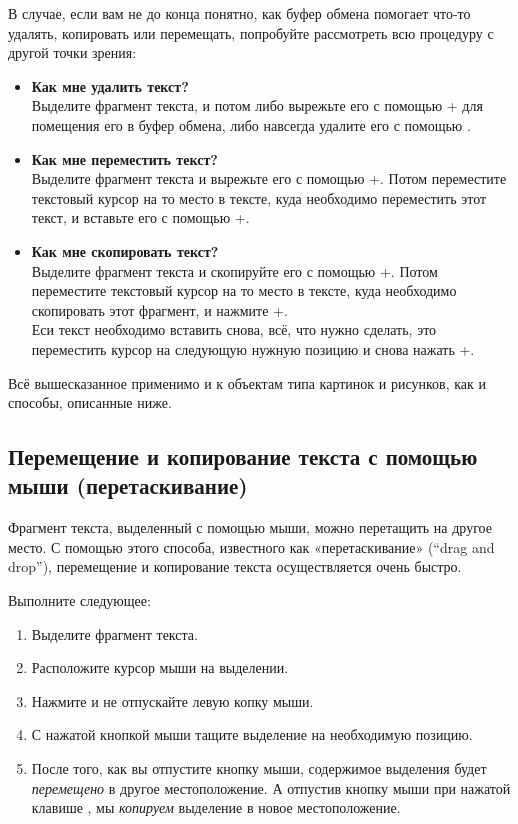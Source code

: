 ﻿\documentclass[a4paper,10pt]{article}
\begin{document}
В случае, если вам не до конца понятно, как буфер обмена помогает что-то удалять, копировать или перемещать, попробуйте рассмотреть всю процедуру с другой точки зрения:
\begin{itemize}
 \item \textbf{Как мне удалить текст?}\\
 Выделите фрагмент текста, и потом либо вырежьте его с помощью + для помещения его в буфер обмена, либо навсегда удалите его с помощью .
 \item \textbf{Как мне переместить текст?}\\
Выделите фрагмент текста и вырежьте его с помощью +. Потом переместите текстовый курсор на то место в тексте, куда необходимо переместить этот текст, и вставьте его с помощью +.
\item \textbf{Как мне скопировать текст?}\\
Выделите фрагмент текста и скопируйте его с помощью +. Потом переместите текстовый курсор на то место в тексте, куда необходимо скопировать этот фрагмент, и нажмите +.\\
Еси текст необходимо вставить снова, всё, что нужно сделать, это переместить курсор на следующую нужную позицию и снова нажать +.
\end{itemize}

Всё вышесказанное применимо и к объектам типа картинок и рисунков, как и способы, описанные ниже.

\subsection{Перемещение и копирование текста с помощью мыши (перетаскивание)}
Фрагмент текста, выделенный с помощью мыши, можно перетащить на другое место. С помощью этого способа, известного как «перетаскивание» (“drag and drop”), перемещение и копирование текста осуществляется очень быстро.

Выполните следующее:

\begin{enumerate}
 \item Выделите фрагмент текста.
 \item Расположите курсор мыши на выделении.
 \item Нажмите и не отпускайте левую копку мыши.
 \item С нажатой кнопкой мыши тащите выделение на необходимую позицию.
 \item После того, как вы отпустите кнопку мыши, содержимое выделения будет \textit{перемещено} в другое местоположение. А отпустив кнопку мыши при нажатой клавише , мы \textit{копируем} выделение в новое местоположение.
\end{enumerate}
\end{document}
